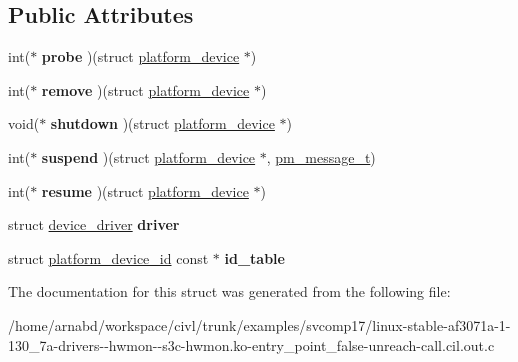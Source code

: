 \subsection*{Public Attributes}
\begin{DoxyCompactItemize}
\item 
\hypertarget{structplatform__driver_a8228668a570fd8d65c76f29d6d8f6b85}{}int($\ast$ {\bfseries probe} )(struct \hyperlink{structplatform__device}{platform\+\_\+device} $\ast$)\label{structplatform__driver_a8228668a570fd8d65c76f29d6d8f6b85}

\item 
\hypertarget{structplatform__driver_a75f56e1444a583a29d3906872db8dcc6}{}int($\ast$ {\bfseries remove} )(struct \hyperlink{structplatform__device}{platform\+\_\+device} $\ast$)\label{structplatform__driver_a75f56e1444a583a29d3906872db8dcc6}

\item 
\hypertarget{structplatform__driver_afd2816a42e5a36fc3fc5e33b05c58534}{}void($\ast$ {\bfseries shutdown} )(struct \hyperlink{structplatform__device}{platform\+\_\+device} $\ast$)\label{structplatform__driver_afd2816a42e5a36fc3fc5e33b05c58534}

\item 
\hypertarget{structplatform__driver_a4299e09134c0dbc59ef843500a090275}{}int($\ast$ {\bfseries suspend} )(struct \hyperlink{structplatform__device}{platform\+\_\+device} $\ast$, \hyperlink{structpm__message}{pm\+\_\+message\+\_\+t})\label{structplatform__driver_a4299e09134c0dbc59ef843500a090275}

\item 
\hypertarget{structplatform__driver_add805abb1ecc1156a5030b9d2310f24d}{}int($\ast$ {\bfseries resume} )(struct \hyperlink{structplatform__device}{platform\+\_\+device} $\ast$)\label{structplatform__driver_add805abb1ecc1156a5030b9d2310f24d}

\item 
\hypertarget{structplatform__driver_aa20fb5d8a5c3b4e5e62778c9d2914bf0}{}struct \hyperlink{structdevice__driver}{device\+\_\+driver} {\bfseries driver}\label{structplatform__driver_aa20fb5d8a5c3b4e5e62778c9d2914bf0}

\item 
\hypertarget{structplatform__driver_a28ffb8ee4f29b7dc9300ac014478f064}{}struct \hyperlink{structplatform__device__id}{platform\+\_\+device\+\_\+id} const $\ast$ {\bfseries id\+\_\+table}\label{structplatform__driver_a28ffb8ee4f29b7dc9300ac014478f064}

\end{DoxyCompactItemize}


The documentation for this struct was generated from the following file\+:\begin{DoxyCompactItemize}
\item 
/home/arnabd/workspace/civl/trunk/examples/svcomp17/linux-\/stable-\/af3071a-\/1-\/130\+\_\+7a-\/drivers-\/-\/hwmon-\/-\/s3c-\/hwmon.\+ko-\/entry\+\_\+point\+\_\+false-\/unreach-\/call.\+cil.\+out.\+c\end{DoxyCompactItemize}
